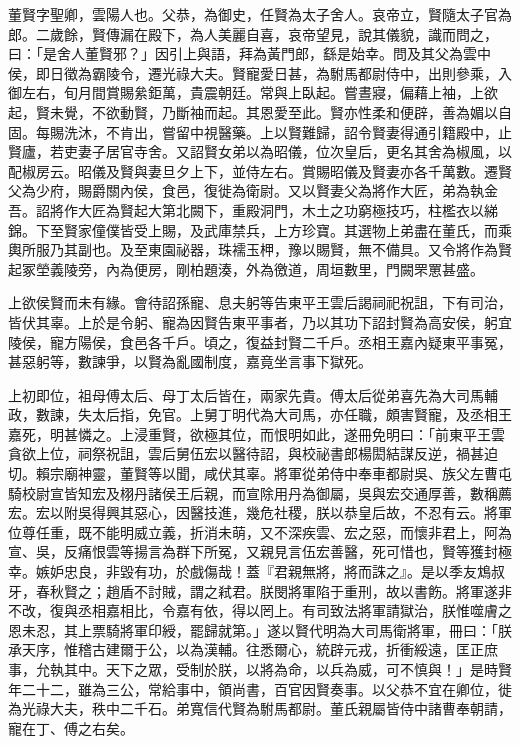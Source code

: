 \begin{pinyinscope}
董賢字聖卿，雲陽人也。父恭，為御史，任賢為太子舍人。哀帝立，賢隨太子官為郎。二歲餘，賢傳漏在殿下，為人美麗自喜，哀帝望見，說其儀貌，識而問之，曰：「是舍人董賢邪？」因引上與語，拜為黃門郎，繇是始幸。問及其父為雲中侯，即日徵為霸陵令，遷光祿大夫。賢寵愛日甚，為駙馬都尉侍中，出則參乘，入御左右，旬月間賞賜絫鉅萬，貴震朝廷。常與上臥起。嘗晝寢，偏藉上袖，上欲起，賢未覺，不欲動賢，乃斷袖而起。其恩愛至此。賢亦性柔和便辟，善為媚以自固。每賜洗沐，不肯出，嘗留中視醫藥。上以賢難歸，詔令賢妻得通引籍殿中，止賢廬，若吏妻子居官寺舍。又詔賢女弟以為昭儀，位次皇后，更名其舍為椒風，以配椒房云。昭儀及賢與妻旦夕上下，並侍左右。賞賜昭儀及賢妻亦各千萬數。遷賢父為少府，賜爵關內侯，食邑，復徙為衛尉。又以賢妻父為將作大匠，弟為執金吾。詔將作大匠為賢起大第北闕下，重殿洞門，木土之功窮極技巧，柱檻衣以綈錦。下至賢家僮僕皆受上賜，及武庫禁兵，上方珍寶。其選物上弟盡在董氏，而乘輿所服乃其副也。及至東園祕器，珠襦玉柙，豫以賜賢，無不備具。又令將作為賢起冢塋義陵旁，內為便房，剛柏題湊，外為徼道，周垣數里，門闕罘罳甚盛。

上欲侯賢而未有緣。會待詔孫寵、息夫躬等告東平王雲后謁祠祀祝詛，下有司治，皆伏其辜。上於是令躬、寵為因賢告東平事者，乃以其功下詔封賢為高安侯，躬宜陵侯，寵方陽侯，食邑各千戶。頃之，復益封賢二千戶。丞相王嘉內疑東平事冤，甚惡躬等，數諫爭，以賢為亂國制度，嘉竟坐言事下獄死。

上初即位，祖母傅太后、母丁太后皆在，兩家先貴。傅太后從弟喜先為大司馬輔政，數諫，失太后指，免官。上舅丁明代為大司馬，亦任職，頗害賢寵，及丞相王嘉死，明甚憐之。上浸重賢，欲極其位，而恨明如此，遂冊免明曰：「前東平王雲貪欲上位，祠祭祝詛，雲后舅伍宏以醫待詔，與校祕書郎楊閎結謀反逆，禍甚迫切。賴宗廟神靈，董賢等以聞，咸伏其辜。將軍從弟侍中奉車都尉吳、族父左曹屯騎校尉宣皆知宏及栩丹諸侯王后親，而宣除用丹為御屬，吳與宏交通厚善，數稱薦宏。宏以附吳得興其惡心，因醫技進，幾危社稷，朕以恭皇后故，不忍有云。將軍位尊任重，既不能明威立義，折消未萌，又不深疾雲、宏之惡，而懷非君上，阿為宣、吳，反痛恨雲等揚言為群下所冤，又親見言伍宏善醫，死可惜也，賢等獲封極幸。嫉妒忠良，非毀有功，於戲傷哉！蓋『君親無將，將而誅之』。是以季友鴆叔牙，春秋賢之；趙盾不討賊，謂之弒君。朕閔將軍陷于重刑，故以書飭。將軍遂非不改，復與丞相嘉相比，令嘉有依，得以罔上。有司致法將軍請獄治，朕惟噬膚之恩未忍，其上票騎將軍印綬，罷歸就第。」遂以賢代明為大司馬衛將軍，冊曰：「朕承天序，惟稽古建爾于公，以為漢輔。往悉爾心，統辟元戎，折衝綏遠，匡正庶事，允執其中。天下之眾，受制於朕，以將為命，以兵為威，可不慎與！」是時賢年二十二，雖為三公，常給事中，領尚書，百官因賢奏事。以父恭不宜在卿位，徙為光祿大夫，秩中二千石。弟寬信代賢為駙馬都尉。董氏親屬皆侍中諸曹奉朝請，寵在丁、傅之右矣。


\end{pinyinscope}
